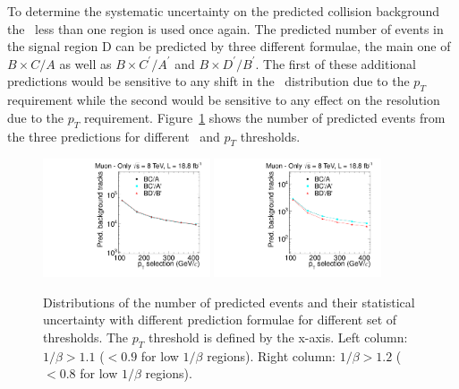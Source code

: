 To determine the systematic uncertainty on the predicted collision background the \invbeta\ less than one region is used once again. The predicted number of events
in the signal region D can be predicted by three different formulae, the main one of $B \times C/A$ as well as 
$B \times C^{\prime}/A^{\prime}$ and $B \times D^{\prime}/B^{\prime}$.
The first of these additional predictions would be sensitive to any shift in the \invbeta\ distribution due to the $p_T$ requirement while the second would be
sensitive to any effect on the resolution due to the $p_T$ requirement. Figure~\ref{fig:MuOnlycorrelation} shows the number of predicted events from the three predictions
for different \invbeta\ and $p_T$ thresholds.

\begin{figure}
\begin{center}
\includegraphics[clip=true, trim=0.0cm 0cm 3.0cm 0cm,width=0.44\textwidth]{figures/muonly/Data8TeVCollisionPrediction_TOF110}
\includegraphics[clip=true, trim=0.0cm 0cm 3.0cm 0cm,width=0.44\textwidth]{figures/muonly/Data8TeVCollisionPrediction_TOF120}
\caption[Distributions of the number of predicted events with different prediction formulae for different sets of thresholds in the \muononly\ analysis.]
{Distributions of the number of predicted events and their statistical uncertainty with different prediction formulae for different set of thresholds.
The $p_{T}$ threshold is defined by the x-axis.
Left column: $1/\beta>1.1$ ($<0.9$ for low $1/\beta$ regions). Right column: $1/\beta>1.2$ ($<0.8$ for low $1/\beta$ regions).}
\label{fig:MuOnlycorrelation}
\end{center}
\end{figure}

